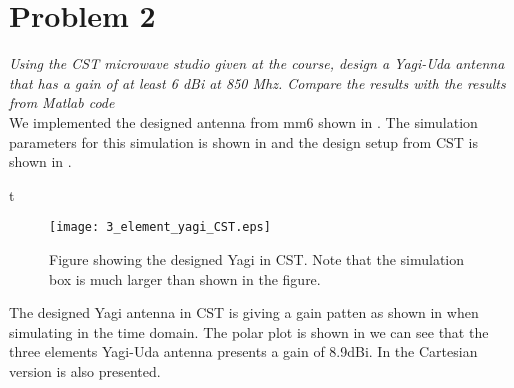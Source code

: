 \section{Problem 2} \label{sec:CST_implimented_Yagi}
\textit{ Using the CST microwave studio given at the course, design a Yagi-Uda antenna that has a gain of at least 6 dBi at 850 Mhz. Compare the results with the results from Matlab code }\\

We implemented the designed antenna from mm6 shown in . The simulation parameters for this simulation is shown in  and the design setup from CST is shown in .

t 
\begin{figure}[!h]
  \centering
  \texttt{[image: 3\_element\_yagi\_CST.eps]}
  \caption{Figure showing the designed Yagi in CST. Note that the simulation box is much larger than shown in the figure.}
  \label{fig:3_element_yagi-uda_geometry}
\end{figure}

The designed Yagi antenna in CST is giving a gain patten as shown in  when simulating in the time domain. The polar plot is shown in  we can see that the three elements Yagi-Uda antenna presents a gain of 8.9dBi. In  the Cartesian version is also presented.

